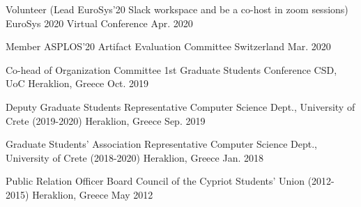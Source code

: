\begin{cvhonors}
  \cvhonor
    {Volunteer (Lead EuroSys'20 Slack workspace and be a co-host in
    zoom sessions)} %
    {EuroSys 2020} %
    {Virtual Conference} %
    {Apr. 2020} %


  \cvhonor
    {Member} %
    {ASPLOS'20 Artifact Evaluation Committee} %
    {Switzerland} %
    {Mar. 2020} %

  \cvhonor
    {Co-head of Organization Committee} %
    {1st Graduate Students Conference CSD, UoC} %
    {Heraklion, Greece} %
    {Oct. 2019} %

  \cvhonor
    {Deputy Graduate Students Representative} %
    {Computer Science Dept., University of Crete (2019-2020)} %
    {Heraklion, Greece} %
    {Sep. 2019} %

  \cvhonor
    {Graduate Students' Association Representative} %
    {Computer Science Dept., University of Crete (2018-2020)} %
    {Heraklion, Greece} %
    {Jan. 2018} %

  \cvhonor
    {Public Relation Officer} %
    {Board Council of the Cypriot Students' Union (2012-2015)} %
    {Heraklion, Greece} %
    {May 2012} %

\end{cvhonors}
